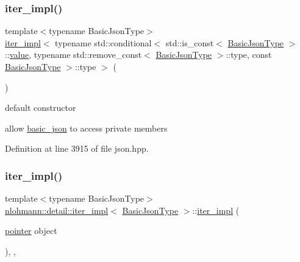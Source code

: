 \subsubsection{\texorpdfstring{iter\+\_\+impl()}{iter\_impl()}\hspace{0.1cm}{\footnotesize\ttfamily [1/3]}}
{\footnotesize\ttfamily template$<$typename Basic\+Json\+Type$>$ \\
\hyperlink{classnlohmann_1_1detail_1_1iter__impl}{iter\+\_\+impl}$<$ typename std\+::conditional$<$ std\+::is\+\_\+const$<$ \hyperlink{classnlohmann_1_1detail_1_1iter__impl_abf18f18793f84b0222aebb5a2a87da7a}{Basic\+Json\+Type} $>$\+::\hyperlink{classnlohmann_1_1detail_1_1iter__impl_ab447c50354c6611fa2ae0100ac17845c}{value}, typename std\+::remove\+\_\+const$<$ \hyperlink{classnlohmann_1_1detail_1_1iter__impl_abf18f18793f84b0222aebb5a2a87da7a}{Basic\+Json\+Type} $>$\+::type, const \hyperlink{classnlohmann_1_1detail_1_1iter__impl_abf18f18793f84b0222aebb5a2a87da7a}{Basic\+Json\+Type} $>$\+::type $>$ (\begin{DoxyParamCaption}{ }\end{DoxyParamCaption})\hspace{0.3cm}{\ttfamily [default]}}



default constructor 

allow \hyperlink{classnlohmann_1_1basic__json}{basic\+\_\+json} to access private members 

Definition at line 3915 of file json.\+hpp.

\mbox{\label{classnlohmann_1_1detail_1_1iter__impl_a88a00484ac201c52fc5f613d88a2918b}} 
\subsubsection{\texorpdfstring{iter\+\_\+impl()}{iter\_impl()}\hspace{0.1cm}{\footnotesize\ttfamily [2/3]}}
{\footnotesize\ttfamily template$<$typename Basic\+Json\+Type$>$ \\
\hyperlink{classnlohmann_1_1detail_1_1iter__impl}{nlohmann\+::detail\+::iter\+\_\+impl}$<$ \hyperlink{classnlohmann_1_1detail_1_1iter__impl_abf18f18793f84b0222aebb5a2a87da7a}{Basic\+Json\+Type} $>$\+::\hyperlink{classnlohmann_1_1detail_1_1iter__impl}{iter\+\_\+impl} (\begin{DoxyParamCaption}\item[{\hyperlink{classnlohmann_1_1detail_1_1iter__impl_a69e52f890ce8c556fd68ce109e24b360}{pointer}}]{object }\end{DoxyParamCaption})\hspace{0.3cm}{\ttfamily [inline]}, {\ttfamily [explicit]}, {\ttfamily [noexcept]}}



